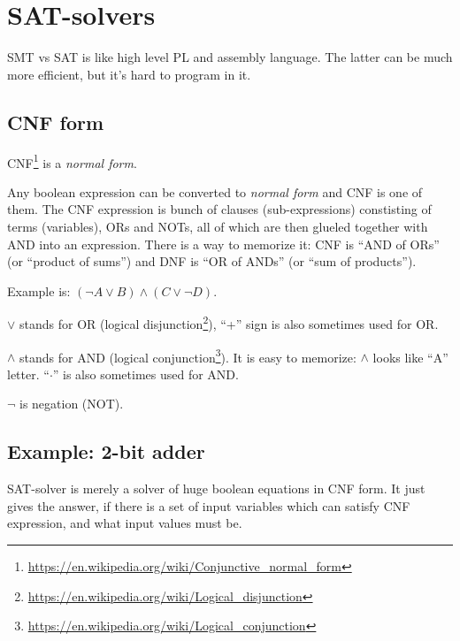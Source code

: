 \section{\ac{SAT}-solvers}

SMT vs SAT is like high level \ac{PL} and assembly language.
The latter can be much more efficient, but it's hard to program in it.

\subsection{CNF form}

\ac{CNF}\footnote{\url{https://en.wikipedia.org/wiki/Conjunctive_normal_form}} is a \textit{normal form}.


Any boolean expression can be converted to \textit{normal form} and \ac{CNF} is one of them.
The \ac{CNF} expression is bunch of clauses (sub-expressions) constisting of terms (variables), ORs and NOTs, 
all of which are then glueled together with AND into an expression.
There is a way to memorize it: \ac{CNF} is ``AND of ORs'' (or ``product of sums'') and \ac{DNF} is ``OR of ANDs'' (or ``sum of products'').

Example is: $(\neg A \vee B) \wedge (C \vee \neg D)$.

$\vee$ stands for OR (logical disjunction\footnote{\url{https://en.wikipedia.org/wiki/Logical_disjunction}}), 
``+'' sign is also sometimes used for OR.

$\wedge$ stands for AND (logical conjunction\footnote{\url{https://en.wikipedia.org/wiki/Logical_conjunction}}).
It is easy to memorize: $\wedge$ looks like ``A'' letter.
``$\cdot$'' is also sometimes used for AND.

$\neg$ is negation (NOT).


\subsection{Example: 2-bit adder}
\label{adder}

\ac{SAT}-solver is merely a solver of huge boolean equations in CNF form.
It just gives the answer, if there is a set of input variables which can satisfy CNF expression, and what input values must be.

